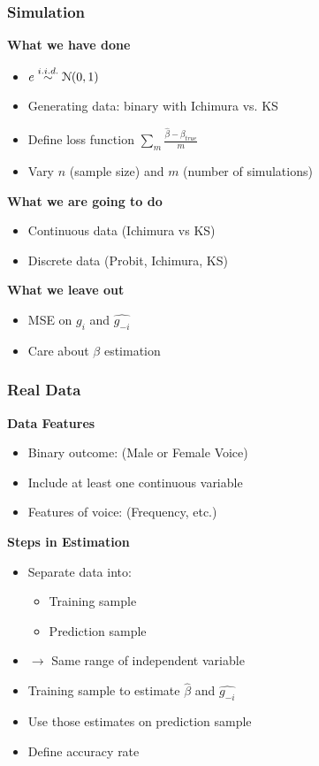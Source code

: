 \documentclass{beamer}
\begin{document}
\begin{frame}[t]
	\frametitle{Simulation}

	\textbf{What we have done}
	\begin{itemize}
		\item $ e \overset{i.i.d.}{\sim} \EuScript{N}(0, 1)$
		\item Generating data: binary with Ichimura vs. KS
		\item Define loss function $ \sum_{m} {\frac{\hat{\beta} - \beta_{true}}{m}} $
		\item Vary $n$ (sample size) and $m$ (number of simulations)
	\end{itemize}
	\textbf{What we are going to do}
	\begin{itemize}
		\item Continuous data (Ichimura vs KS)
		\item Discrete data (Probit, Ichimura, KS)
	\end{itemize}
	\textbf{What we leave out}
	\begin{itemize}
		\item MSE on $g_{i}$ and $ \hat{g_{-i}} $
		\item Care about $\beta$ estimation
	\end{itemize}
	\note{~}
\end{frame}



\begin{frame}
	\frametitle{Real Data}
	
	\textbf{Data Features}
	\begin{itemize}
		\item Binary outcome:  (Male or Female Voice)
		\item Include at least one continuous variable
		\item Features of voice: (Frequency, etc.)
	\end{itemize}
	\textbf{Steps in Estimation}
	\begin{itemize}
		\item Separate data into:
		\begin{itemize}
			\item Training sample
			\item Prediction sample
		\end{itemize}
		\item $\rightarrow$ Same range of independent variable
		\item Training sample to estimate $\hat{\beta}$ and $\hat{g_{-i}}$
		\item Use those estimates on prediction sample
		\item Define accuracy rate
	\end{itemize}
	\note{~}
\end{frame}
\end{document}
